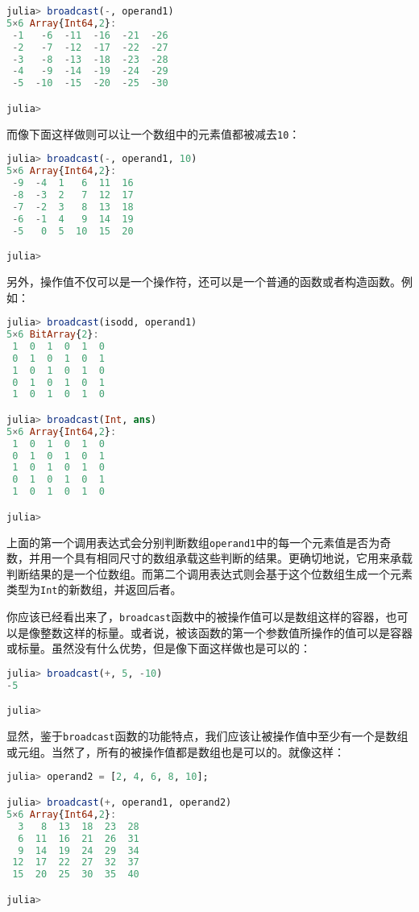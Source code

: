 \begin{lstlisting}[language=julia]
julia> broadcast(-, operand1)
5×6 Array{Int64,2}:
 -1   -6  -11  -16  -21  -26
 -2   -7  -12  -17  -22  -27
 -3   -8  -13  -18  -23  -28
 -4   -9  -14  -19  -24  -29
 -5  -10  -15  -20  -25  -30

julia> 
\end{lstlisting}

而像下面这样做则可以让一个数组中的元素值都被减去\verb|10|：

\begin{lstlisting}[language=julia]
julia> broadcast(-, operand1, 10)
5×6 Array{Int64,2}:
 -9  -4  1   6  11  16
 -8  -3  2   7  12  17
 -7  -2  3   8  13  18
 -6  -1  4   9  14  19
 -5   0  5  10  15  20

julia> 
\end{lstlisting}

另外，操作值不仅可以是一个操作符，还可以是一个普通的函数或者构造函数。例如：

\begin{lstlisting}[language=julia]
julia> broadcast(isodd, operand1)
5×6 BitArray{2}:
 1  0  1  0  1  0
 0  1  0  1  0  1
 1  0  1  0  1  0
 0  1  0  1  0  1
 1  0  1  0  1  0

julia> broadcast(Int, ans)
5×6 Array{Int64,2}:
 1  0  1  0  1  0
 0  1  0  1  0  1
 1  0  1  0  1  0
 0  1  0  1  0  1
 1  0  1  0  1  0

julia> 
\end{lstlisting}

上面的第一个调用表达式会分别判断数组\verb|operand1|中的每一个元素值是否为奇数，并用一个具有相同尺寸的数组承载这些判断的结果。更确切地说，它用来承载判断结果的是一个位数组。而第二个调用表达式则会基于这个位数组生成一个元素类型为\verb|Int|的新数组，并返回后者。

你应该已经看出来了，\verb|broadcast|函数中的被操作值可以是数组这样的容器，也可以是像整数这样的标量。或者说，被该函数的第一个参数值所操作的值可以是容器或标量。虽然没有什么优势，但是像下面这样做也是可以的：

\begin{lstlisting}[language=julia]
julia> broadcast(+, 5, -10)
-5

julia> 
\end{lstlisting}

显然，鉴于\verb|broadcast|函数的功能特点，我们应该让被操作值中至少有一个是数组或元组。当然了，所有的被操作值都是数组也是可以的。就像这样：

\begin{lstlisting}[language=julia]
julia> operand2 = [2, 4, 6, 8, 10];

julia> broadcast(+, operand1, operand2)
5×6 Array{Int64,2}:
  3   8  13  18  23  28
  6  11  16  21  26  31
  9  14  19  24  29  34
 12  17  22  27  32  37
 15  20  25  30  35  40

julia> 
\end{lstlisting}

